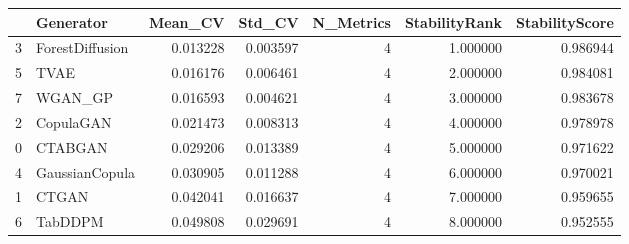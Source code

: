 \begin{tabular}{llrrrrr}
\toprule
 & Generator & Mean_CV & Std_CV & N_Metrics & StabilityRank & StabilityScore \\
\midrule
3 & ForestDiffusion & 0.013228 & 0.003597 & 4 & 1.000000 & 0.986944 \\
5 & TVAE & 0.016176 & 0.006461 & 4 & 2.000000 & 0.984081 \\
7 & WGAN_GP & 0.016593 & 0.004621 & 4 & 3.000000 & 0.983678 \\
2 & CopulaGAN & 0.021473 & 0.008313 & 4 & 4.000000 & 0.978978 \\
0 & CTABGAN & 0.029206 & 0.013389 & 4 & 5.000000 & 0.971622 \\
4 & GaussianCopula & 0.030905 & 0.011288 & 4 & 6.000000 & 0.970021 \\
1 & CTGAN & 0.042041 & 0.016637 & 4 & 7.000000 & 0.959655 \\
6 & TabDDPM & 0.049808 & 0.029691 & 4 & 8.000000 & 0.952555 \\
\bottomrule
\end{tabular}
